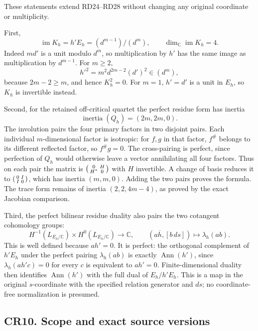 \documentclass[
]{article}
\begin{document}
These statements extend RD24--RD28 without changing any original
coordinate or multiplicity.

First, \[
\operatorname{im}K_h=h'E_h=(d^{m-1})/(d^m),
\qquad \dim_{\mathbb C}\operatorname{im}K_h=4.
\] Indeed \(m d'\) is a unit modulo \(d^m\), so multiplication by \(h'\)
has the same image as multiplication by \(d^{m-1}\). For \(m\ge2\), \[
h'^2=m^2d^{2m-2}(d')^2\in(d^m),
\] because \(2m-2\ge m\), and hence \(K_h^2=0\). For \(m=1\), \(h'=d'\)
is a unit in \(E_h\), so \(K_h\) is invertible instead.

Second, for the retained off-critical quartet the perfect residue form
has inertia \[
\operatorname{inertia}(Q_h)=(2m,2m,0).
\] The involution pairs the four primary factors in two disjoint pairs.
Each individual \(m\)-dimensional factor is isotropic: for \(f,g\) in
that factor, \(f^\#\) belongs to its different reflected factor, so
\(f^\#g=0\). The cross-pairing is perfect, since perfection of \(Q_h\)
would otherwise leave a vector annihilating all four factors. Thus on
each pair the matrix is
\(\begin{psmallmatrix}0&H\\H^*&0\end{psmallmatrix}\) with \(H\)
invertible. A change of basis reduces it to
\(\begin{psmallmatrix}0&I\\I&0\end{psmallmatrix}\), which has inertia
\((m,m,0)\). Adding the two pairs proves the formula. The trace form
remains of inertia \((2,2,4m-4)\), as proved by the exact Jacobian
comparison.

Third, the perfect bilinear residue duality also pairs the two cotangent
cohomology groups: \[
H^{-1}(L_{E_h/\mathbb C})\times H^0(L_{E_h/\mathbb C})
\longrightarrow\mathbb C,\qquad
(a\overline h,[b\,ds])\longmapsto\lambda_h(ab).
\] This is well defined because \(ah'=0\). It is perfect: the orthogonal
complement of \(h'E_h\) under the perfect pairing \(\lambda_h(ab)\) is
exactly \(\operatorname{Ann}(h')\), since \(\lambda_h(ah'c)=0\) for
every \(c\) is equivalent to \(ah'=0\). Finite-dimensional duality then
identifies \(\operatorname{Ann}(h')\) with the full dual of
\(E_h/h'E_h\). This is a map in the original \(s\)-coordinate with the
specified relation generator and \(ds\); no coordinate-free
normalization is presumed.

\subsection{CR10. Scope and exact source
versions}\label{cr10.-scope-and-exact-source-versions}
\end{document}
